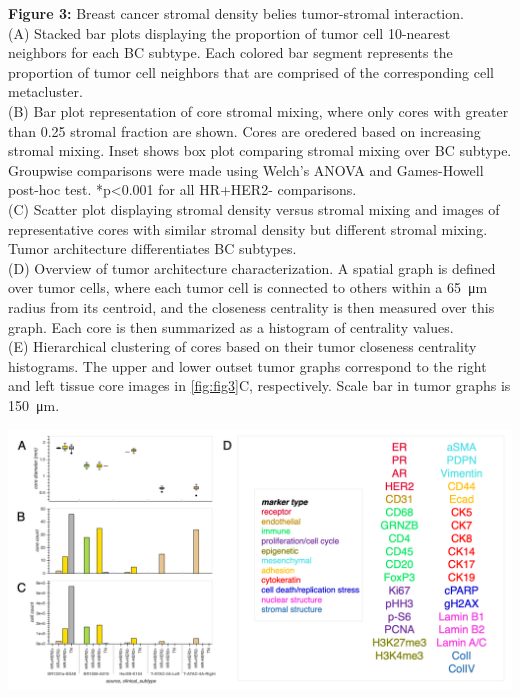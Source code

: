 \documentclass[preprint,review,3p,12pt]{elsarticle}
\begin{document}
\noindent
\textbf{Figure 3:} Breast cancer stromal density belies tumor-stromal interaction. \\
(A) Stacked bar plots displaying the proportion of tumor cell 10-nearest neighbors for each BC subtype. Each colored bar segment represents the proportion of tumor cell neighbors that are comprised of the corresponding cell metacluster. \\
(B) Bar plot representation of core stromal mixing, where only cores with greater than 0.25 stromal fraction are shown. Cores are oredered based on increasing stromal mixing. Inset shows box plot comparing stromal mixing over BC subtype. Groupwise comparisons were made using Welch's ANOVA and Games-Howell post-hoc test. *p<0.001 for all HR+HER2- comparisons. \\
(C) Scatter plot displaying stromal density versus stromal mixing and images of representative cores with similar stromal density but different stromal mixing.\\
Tumor architecture differentiates BC subtypes. \\
(D) Overview of tumor architecture characterization. A spatial graph is defined over tumor cells, where each tumor cell is connected to others within a \SI{65}{\micro\meter} radius from its centroid, and the closeness centrality is then measured over this graph. Each core is then summarized as a histogram of centrality values. \\
(E) Hierarchical clustering of cores based on their tumor closeness centrality histograms. The upper and lower outset tumor graphs correspond to the right and left tissue core images in \autoref{fig:fig3}C, respectively. Scale bar in tumor graphs is \SI{150}{\micro\meter}.

\newpage

\begin{suppfigure}[h]
\centering\includegraphics[width=\linewidth,
                 keepaspectratio]{suppfig1}
\caption{}
\label{fig:suppfig1}
\end{suppfigure}
\end{document}
